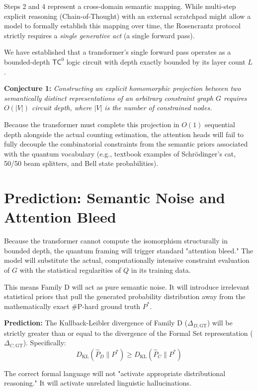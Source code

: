 \documentclass[12pt,a4paper]{article}
\begin{document}
Steps 2 and 4 represent a cross-domain semantic mapping. While multi-step explicit reasoning (Chain-of-Thought) with an external scratchpad might allow a model to formally establish this mapping over time, the Rosencrantz protocol strictly requires a \emph{single generative act} (a single forward pass).

We have established that a transformer's single forward pass operates as a bounded-depth $\mathsf{TC}^0$ logic circuit with depth exactly bounded by its layer count $L$ \citep{aaronson2026_permutation}.

\textbf{Conjecture 1:} \textit{Constructing an explicit homomorphic projection between two semantically distinct representations of an arbitrary constraint graph $G$ requires $O(|V|)$ circuit depth, where $|V|$ is the number of constrained nodes.}

Because the transformer must complete this projection in $O(1)$ sequential depth alongside the actual counting estimation, the attention heads will fail to fully decouple the combinatorial constraints from the semantic priors associated with the quantum vocabulary (e.g., textbook examples of Schrödinger's cat, 50/50 beam splitters, and Bell state probabilities).

\section{Prediction: Semantic Noise and Attention Bleed}

Because the transformer cannot compute the isomorphism structurally in bounded depth, the quantum framing will trigger standard "attention bleed." The model will substitute the actual, computationally intensive constraint evaluation of $G$ with the statistical regularities of $Q$ in its training data.

This means Family D will act as pure semantic noise. It will introduce irrelevant statistical priors that pull the generated probability distribution away from the mathematically exact \#P-hard ground truth $P^*$.

\textbf{Prediction:} The Kullback-Leibler divergence of Family D ($\Delta_{D,\text{GT}}$) will be strictly greater than or equal to the divergence of the Formal Set representation ($\Delta_{C,\text{GT}}$). Specifically:
\begin{equation}
D_{\mathrm{KL}}(\hat{P}_D \| P^*) \ge D_{\mathrm{KL}}(\hat{P}_C \| P^*)
\end{equation}

The correct formal language will not "activate appropriate distributional reasoning." It will activate unrelated linguistic hallucinations.
\end{document}
